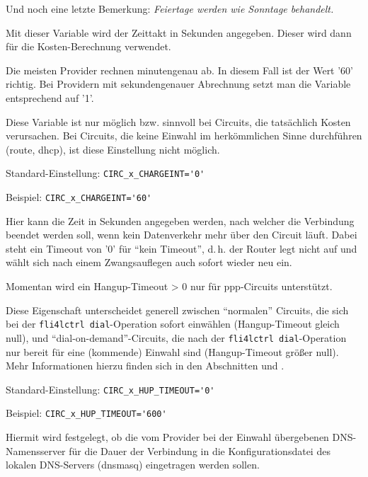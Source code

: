 \begin{description}
Und noch eine letzte Bemerkung: \emph{Feiertage werden wie Sonntage behandelt.}


Mit dieser Variable wird der Zeittakt in Sekunden angegeben. Dieser
wird dann für die Kosten-Berechnung verwendet.

Die meisten Provider rechnen minutengenau ab. In diesem Fall ist der Wert '60'
richtig. Bei Providern mit sekundengenauer Abrechnung setzt man die Variable
entsprechend auf '1'.

Diese Variable ist nur möglich bzw. sinnvoll bei Circuits, die tatsächlich
Kosten verursachen. Bei Circuits, die keine Einwahl im herkömmlichen Sinne
durchführen (route, dhcp), ist diese Einstellung nicht möglich.

Standard-Einstellung: \verb+CIRC_x_CHARGEINT='0'+

Beispiel: \verb+CIRC_x_CHARGEINT='60'+


Hier kann die Zeit in Sekunden angegeben werden, nach welcher die Verbindung
beendet werden soll, wenn kein Datenverkehr mehr über den Circuit läuft. Dabei
steht ein Timeout von '0' für ``kein Timeout'', d.\,h. der Router legt nicht
auf und wählt sich nach einem Zwangsauflegen auch sofort wieder neu ein.

Momentan wird ein Hangup-Timeout > 0 nur für ppp-Circuits unterstützt.

Diese Eigenschaft unterscheidet generell zwischen ``normalen'' Circuits, die
sich bei der \texttt{fli4lctrl dial}-Operation sofort einwählen
(Hangup-Timeout gleich null), und ``dial-on-demand''-Circuits, die nach der
\texttt{fli4lctrl dial}-Operation nur bereit für eine (kommende) Einwahl sind
(Hangup-Timeout größer null). Mehr Informationen hierzu finden sich in den
Abschnitten  und
.

Standard-Einstellung: \verb+CIRC_x_HUP_TIMEOUT='0'+

Beispiel: \verb+CIRC_x_HUP_TIMEOUT='600'+


Hiermit wird festgelegt, ob die vom Provider bei der Einwahl übergebenen
DNS-Namensserver für die Dauer der Verbindung in die Konfigurationsdatei des
lokalen DNS-Servers (dnsmasq) eingetragen werden sollen.


\end{description}
